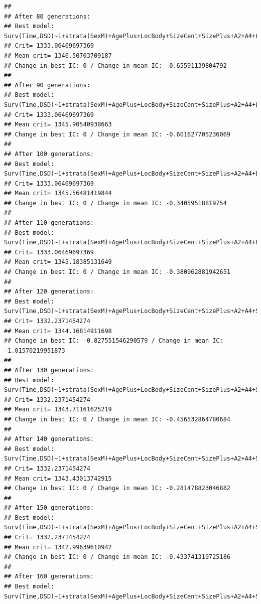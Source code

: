 \documentclass{article}\usepackage[]{graphicx}\usepackage[]{color}
\makeatletter
\newenvironment{kframe}{%
 \def\at@end@of@kframe{}%
 \ifinner\ifhmode%
  \def\at@end@of@kframe{\end{minipage}}%
  \begin{minipage}{\columnwidth}%
 \fi\fi%
 \def\FrameCommand##1{\hskip\@totalleftmargin \hskip-\fboxsep
 \colorbox{shadecolor}{##1}\hskip-\fboxsep
     \hskip-\linewidth \hskip-\@totalleftmargin \hskip\columnwidth}%
 \MakeFramed {\advance\hsize-\width
   \@totalleftmargin\z@ \linewidth\hsize
   \@setminipage}}%
 {\par\unskip\endMakeFramed%
 \at@end@of@kframe}
\newenvironment{knitrout}{}{} %
\makeatother
\begin{document}
\begin{knitrout}
\begin{kframe}
\begin{verbatim}
## 
## After 80 generations:
## Best model: Surv(Time,DSD)~1+strata(SexM)+AgePlus+LocBody+SizeCent+SizePlus+A2+A4+LocBody:AgePlus+SizeCent:LocBody+A2:SizeCent+strata(SexM):AgePlus+strata(SexM):SizePlus
## Crit= 1333.06469697369
## Mean crit= 1346.50703709187
## Change in best IC: 0 / Change in mean IC: -0.65591139804792
## 
## After 90 generations:
## Best model: Surv(Time,DSD)~1+strata(SexM)+AgePlus+LocBody+SizeCent+SizePlus+A2+A4+LocBody:AgePlus+SizeCent:LocBody+A2:SizeCent+strata(SexM):AgePlus+strata(SexM):SizePlus
## Crit= 1333.06469697369
## Mean crit= 1345.90540938663
## Change in best IC: 0 / Change in mean IC: -0.601627705236069
## 
## After 100 generations:
## Best model: Surv(Time,DSD)~1+strata(SexM)+AgePlus+LocBody+SizeCent+SizePlus+A2+A4+LocBody:AgePlus+SizeCent:LocBody+A2:SizeCent+strata(SexM):AgePlus+strata(SexM):SizePlus
## Crit= 1333.06469697369
## Mean crit= 1345.56481419844
## Change in best IC: 0 / Change in mean IC: -0.34059518819754
## 
## After 110 generations:
## Best model: Surv(Time,DSD)~1+strata(SexM)+AgePlus+LocBody+SizeCent+SizePlus+A2+A4+LocBody:AgePlus+SizeCent:LocBody+A2:SizeCent+strata(SexM):AgePlus+strata(SexM):SizePlus
## Crit= 1333.06469697369
## Mean crit= 1345.18385131649
## Change in best IC: 0 / Change in mean IC: -0.380962881942651
## 
## After 120 generations:
## Best model: Surv(Time,DSD)~1+strata(SexM)+AgePlus+LocBody+SizeCent+SizePlus+A2+A4+SizeCent:LocBody+A2:SizeCent+strata(SexM):AgePlus+strata(SexM):SizePlus
## Crit= 1332.2371454274
## Mean crit= 1344.16814911698
## Change in best IC: -0.827551546290579 / Change in mean IC: -1.01570219951873
## 
## After 130 generations:
## Best model: Surv(Time,DSD)~1+strata(SexM)+AgePlus+LocBody+SizeCent+SizePlus+A2+A4+SizeCent:LocBody+A2:SizeCent+strata(SexM):AgePlus+strata(SexM):SizePlus
## Crit= 1332.2371454274
## Mean crit= 1343.71161625219
## Change in best IC: 0 / Change in mean IC: -0.456532864780684
## 
## After 140 generations:
## Best model: Surv(Time,DSD)~1+strata(SexM)+AgePlus+LocBody+SizeCent+SizePlus+A2+A4+SizeCent:LocBody+A2:SizeCent+strata(SexM):AgePlus+strata(SexM):SizePlus
## Crit= 1332.2371454274
## Mean crit= 1343.43013742915
## Change in best IC: 0 / Change in mean IC: -0.281478823046882
## 
## After 150 generations:
## Best model: Surv(Time,DSD)~1+strata(SexM)+AgePlus+LocBody+SizeCent+SizePlus+A2+A4+SizeCent:LocBody+A2:SizeCent+strata(SexM):AgePlus+strata(SexM):SizePlus
## Crit= 1332.2371454274
## Mean crit= 1342.99639610942
## Change in best IC: 0 / Change in mean IC: -0.433741319725186
## 
## After 160 generations:
## Best model: Surv(Time,DSD)~1+strata(SexM)+AgePlus+LocBody+SizeCent+SizePlus+A2+A4+SizeCent:LocBody+A2:SizeCent+strata(SexM):AgePlus+strata(SexM):SizePlus

\end{verbatim}
\end{kframe}
\end{knitrout}
\end{document}
